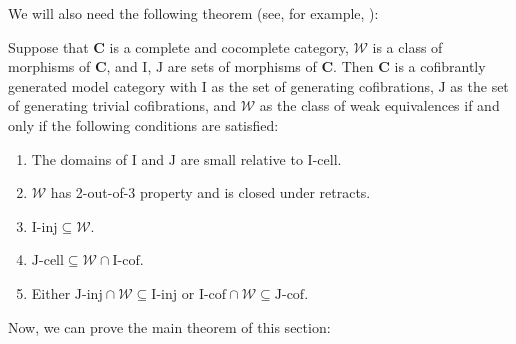 \documentclass[reqno]{amsart}
\theoremstyle{definition}
\theoremstyle{remark}
\newcommand{\cat}[1]{\mathbf{#1}}
\newcommand{\C}{\cat{C}}
\newcommand{\we}{\mathcal{W}}
\newcommand{\I}{\mathrm{I}}
\newcommand{\J}{\mathrm{J}}
\newcommand{\class}[2]{#1\text{-}\mathrm{#2}}
\newcommand{\Icell}[1][\I]{\class{#1}{cell}}
\newcommand{\Icof}[1][\I]{\class{#1}{cof}}
\newcommand{\Iinj}[1][\I]{\class{#1}{inj}}
\newcommand{\Jinj}[1][]{\Iinj[\J#1]}
\newcommand{\Jcell}[1][]{\Icell[\J#1]}
\newcommand{\Jcof}[1][]{\Icof[\J#1]}
\numberwithin{figure}{section}
\begin{document}
We will also need the following theorem (see, for example, \cite{hovey}):
\begin{thm}
Suppose that $\C$ is a complete and cocomplete category, $\we$ is a class of morphisms of $\C$, and $\I$, $\J$ are sets of morphisms of $\C$.
Then $\C$ is a cofibrantly generated model category with $\I$ as the set of generating cofibrations,
$\J$ as the set of generating trivial cofibrations, and $\we$ as the class of weak equivalences if and only if the following conditions are satisfied:
\begin{enumerate}
\item The domains of $\I$ and $\J$ are small relative to $\Icell$.
\item $\we$ has 2-out-of-3 property and is closed under retracts.
\item $\Iinj \subseteq \we$.
\item $\Jcell \subseteq \we \cap \Icof$.
\item Either $\Jinj \cap \we \subseteq \Iinj$ or $\Icof \cap \we \subseteq \Jcof$.
\end{enumerate}
\end{thm}

Now, we can prove the main theorem of this section:
\end{document}
